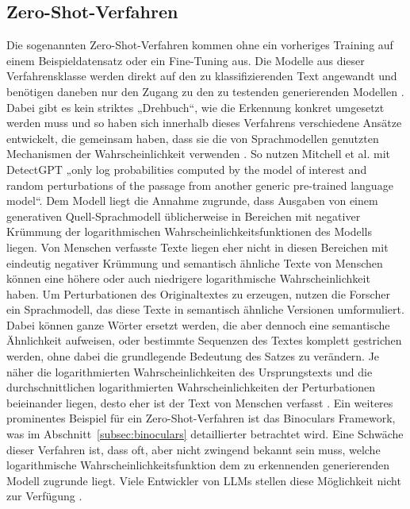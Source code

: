 \subsection{Zero-Shot-Verfahren}
Die sogenannten Zero-Shot-Verfahren kommen ohne ein vorheriges Training auf einem Beispieldatensatz oder ein Fine-Tuning aus. Die Modelle aus dieser Verfahrensklasse werden direkt auf den zu klassifizierenden Text angewandt und benötigen daneben nur den Zugang zu den zu testenden generierenden Modellen \autocite{Proehl_Mohrhardt_Foerster_Putzier_Zarnekow_2024}. Dabei gibt es kein striktes „Drehbuch“, wie die Erkennung konkret umgesetzt werden muss und so haben sich innerhalb dieses Verfahrens verschiedene Ansätze entwickelt, die gemeinsam haben, dass sie die von Sprachmodellen genutzten Mechanismen der Wahrscheinlichkeit verwenden \autocite{kehkashan2025}. So nutzen Mitchell et al. \autocite{mitchell2023detectgptzeroshotmachinegeneratedtext} mit DetectGPT „only log probabilities computed by the model of interest and random perturbations of the passage from another generic pre-trained language model“. Dem Modell liegt die Annahme zugrunde, dass Ausgaben von einem generativen Quell-Sprachmodell üblicherweise in Bereichen mit negativer Krümmung der logarithmischen Wahrscheinlichkeitsfunktionen des Modells liegen. Von Menschen verfasste Texte liegen eher nicht in diesen Bereichen mit eindeutig negativer Krümmung und semantisch ähnliche Texte von Menschen können eine höhere oder auch niedrigere logarithmische Wahrscheinlichkeit haben. Um Perturbationen des Originaltextes zu erzeugen, nutzen die Forscher ein Sprachmodell, das diese Texte in semantisch ähnliche Versionen umformuliert. Dabei können ganze Wörter ersetzt werden, die aber dennoch eine semantische Ähnlichkeit aufweisen, oder bestimmte Sequenzen des Textes komplett gestrichen werden, ohne dabei die grundlegende Bedeutung des Satzes zu verändern. Je näher die logarithmierten Wahrscheinlichkeiten des Ursprungstexts und die durchschnittlichen logarithmierten Wahrscheinlichkeiten der Perturbationen beieinander liegen, desto eher ist der Text von Menschen verfasst \autocite{mitchell2023detectgptzeroshotmachinegeneratedtext}. Ein weiteres prominentes Beispiel für ein Zero-Shot-Verfahren ist das Binoculars Framework, was im Abschnitt~\ref{subsec:binoculars} detaillierter betrachtet wird. Eine Schwäche dieser Verfahren ist, dass oft, aber nicht zwingend bekannt sein muss, welche logarithmische Wahrscheinlichkeitsfunktion dem zu erkennenden generierenden Modell zugrunde liegt. Viele Entwickler von LLMs stellen diese Möglichkeit nicht zur Verfügung \autocite{SUN2025129829,mitchell2023detectgptzeroshotmachinegeneratedtext}.

